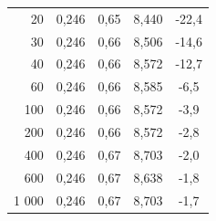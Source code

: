 \documentclass[a4paper, czech]{article}
\begin{document}
\begin{table}[H]
\begin{tabular}{rcccc}
        20         & 0,246                                                                       & 0,65                           & 8,440                                                        & -22,4                                                       \\
        30         & 0,246                                                                       & 0,66                           & 8,506                                                        & -14,6                                                       \\
        40         & 0,246                                                                       & 0,66                           & 8,572                                                        & -12,7                                                       \\
        60         & 0,246                                                                       & 0,66                           & 8,585                                                        & -6,5                                                        \\
        100        & 0,246                                                                       & 0,66                           & 8,572                                                        & -3,9                                                        \\
        200        & 0,246                                                                       & 0,66                           & 8,572                                                        & -2,8                                                        \\
        400        & 0,246                                                                       & 0,67                           & 8,703                                                        & -2,0                                                        \\
        600        & 0,246                                                                       & 0,67                           & 8,638                                                        & -1,8                                                        \\
        1 000       & 0,246                                                                       & 0,67                           & 8,703                                                        & -1,7                                                        \\

\end{tabular}
\end{table}
\end{document}
